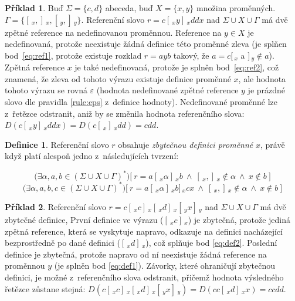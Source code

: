 \documentclass[thesis=B,czech]{FITthesis}[2019/12/23]
\theoremstyle{definition}
\newtheorem{definition}{Definice}[chapter]
\newtheorem{example}{Příklad}[chapter]
\begin{document}
\begin{example}
	Buď $\Sigma = \{c, d\}$ abeceda, buď $X=\{x, y\}$ množina proměnných. $\Gamma = \{[\,_x , ]\,_x, [\,_y , ]\,_y\}$. Referenční slovo $r = c [\,_x y ]\,_x ddx$ nad $\Sigma\cup X\cup\Gamma$ má dvě zpětné reference na nedefinovanou proměnnou. Reference na $y \in X$ je nedefinovaná, protože neexistuje žádná definice této proměnné zleva (je splňen bod~\ref{eq:ref1}, protože existuje rozklad $r=ayb$ takový, že $a = c [\,_x$ a $]\,_y \notin a$). Zpětná reference $x$ je také nedefinovaná, protože je splněn bod~\ref{eq:ref2}, což znamená, že zleva od tohoto výrazu existuje definice proměnné $x$, ale hodnota tohoto výrazu se rovná $\varepsilon$ (hodnota nedefinované zpětné reference $y$ je prázdné slovo dle pravidla \ref{rule:eps} z~definice hodnoty). Nedefinované proměnné lze z~řetězce odstranit, aniž by se změnila hodnota referenčního slova: $D( c [\,_x y ]\,_x ddx ) = D(c [\,_x ]\,_x d d) = cdd$.
\end{example}

\begin{definition}\label{def:ref}
Referenční slovo $r$ obsahuje \emph{zbytečnou definici proměnné} $x$, právě když platí alespoň jedno z~následujících tvrzení:

	\begin{equation}\label{eq:def1}\bigg (\exists  \alpha, a, b \in \left(\Sigma \cup X \cup \Gamma\right)^\ast\bigg) \bigg [ \ r = a [\,_x \alpha  ]\,_x b \ \wedge \  [\,_x, ]\,_x \notin \alpha  \ \wedge \ x \notin b \ \bigg] \end{equation}
	\begin{equation}\label{eq:def2}\bigg(\exists  \alpha, a, b, c \in \left(\Sigma \cup X \cup \Gamma\right)^\ast\bigg) \bigg [ \ r = a [\,_x \alpha  ]\,_x b  ]\,_x c x \ \wedge \  [\,_x, ]\,_x \notin \alpha  \ \wedge \ x \notin b \ \bigg ]\end{equation}
\end{definition}

\begin{example}
	Referenční slovo $r = c [\,_x c ]\,_x [\,_x d ]\,_x [\,_y x ]\,_y$ nad $\Sigma\cup X\cup\Gamma$ má dvě zbytečné definice, První definice ve výrazu ($[\,_x c ]\,_x$) je zbytečná, protože jediná zpětná reference, která se vyskytuje napravo, odkazuje na definici nacházející bezprostředně po dané definici ($ [\,_x d ]\,_x$), což splňuje bod \ref{eq:def2}. Poslední definice je zbytečná, protože napravo od ní neexistuje žádná reference na proměnnou $y$ (je splněn bod \ref{eq:def1}). Závorky, které ohraničují zbytečnou definici, je možné z~referenčního slova odstranit, přičemž hodnota výsledného řetězce zůstane stejná: $D(c [\,_x c ]\,_x [\,_x d ]\,_x [\,_y x ]\,_y)=D(c c [\,_x d ]\,_x x)=ccdd$.
\end{example}
\end{document}
